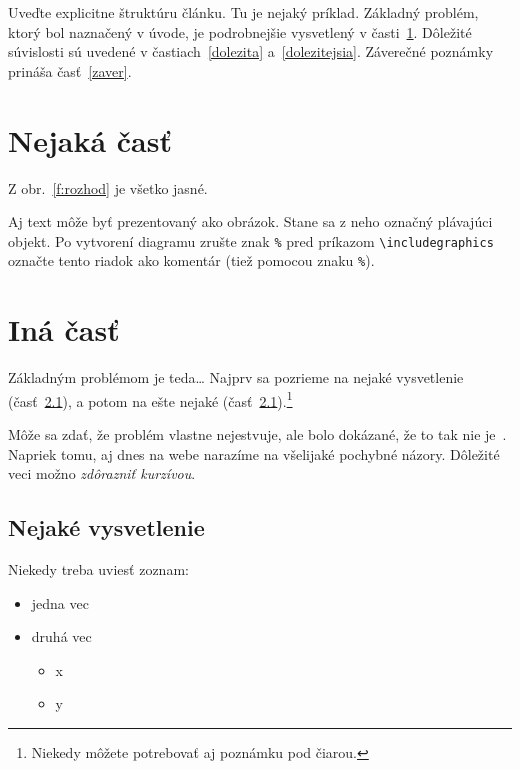 \documentclass[10pt,twoside,slovak,a4paper]{article}
\begin{document}
Uveďte explicitne štruktúru článku. Tu je nejaký príklad.
Základný problém, ktorý bol naznačený v úvode, je podrobnejšie vysvetlený v časti~\ref{nejaka}.
Dôležité súvislosti sú uvedené v častiach~\ref{dolezita} a~\ref{dolezitejsia}.
Záverečné poznámky prináša časť~\ref{zaver}.



\section{Nejaká časť} \label{nejaka}

Z obr.~\ref{f:rozhod} je všetko jasné. 

\begin{figure*}[tbh]
\centering
Aj text môže byť prezentovaný ako obrázok. Stane sa z neho označný plávajúci objekt. Po vytvorení diagramu zrušte znak \texttt{\%} pred príkazom \verb|\includegraphics| označte tento riadok ako komentár (tiež pomocou znaku \texttt{\%}).
\caption{Rozhodujúci argument.}
\label{f:rozhod}
\end{figure*}



\section{Iná časť} \label{ina}

Základným problémom je teda\ldots{} Najprv sa pozrieme na nejaké vysvetlenie (časť~\ref{ina:nejake}), a potom na ešte nejaké (časť~\ref{ina:nejake}).\footnote{Niekedy môžete potrebovať aj poznámku pod čiarou.}

Môže sa zdať, že problém vlastne nejestvuje\cite{Coplien:MPD}, ale bolo dokázané, že to tak nie je~\cite{Czarnecki:Staged, Czarnecki:Progress}. Napriek tomu, aj dnes na webe narazíme na všelijaké pochybné názory\cite{PLP-Framework}. Dôležité veci možno \emph{zdôrazniť kurzívou}.


\subsection{Nejaké vysvetlenie} \label{ina:nejake}

Niekedy treba uviesť zoznam:

\begin{itemize}
\item jedna vec
\item druhá vec
	\begin{itemize}
	\item x
	\item y
	\end{itemize}
\end{itemize}
\end{document}

